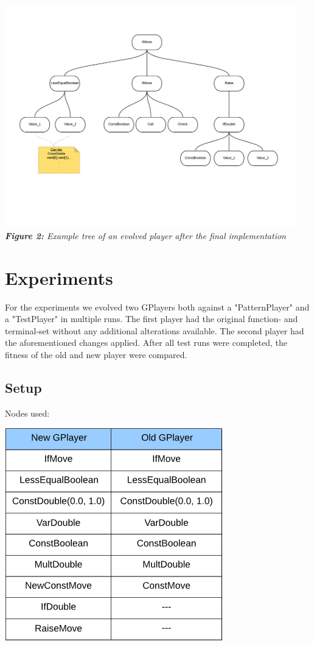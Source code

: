 \documentclass[12pt,fleqn,a4paper]{article}
\begin{document}
\begin{center}
	\includegraphics[width=0.95\textwidth]{NewRaise.png}
	\textit{\textbf{Figure 2: }Example tree of an evolved player after the final implementation}
\end{center}

\newpage
\section{Experiments}
For the experiments we evolved two GPlayers both against a "PatternPlayer" and a "TestPlayer" in multiple runs. The first player had the original function- and terminal-set without any additional alterations available. The second player had the aforementioned changes applied. After all test runs were completed, the fitness of the old and new player were compared.

\subsection{Setup}
Nodes used:
\begin{flushleft}
	\includegraphics[width=.3\textwidth]{node_table.png}
\end{flushleft}	
\end{document}
